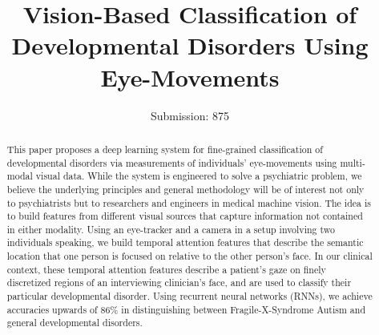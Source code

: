 \documentclass{llncs}
\begin{document}
  \title{Vision-Based Classification of Developmental Disorders Using Eye-Movements}
  \author{Submission: 875}
  \institute{}


  \maketitle

  \begin{abstract}
    This paper proposes a {\color{red} deep learning} system for fine-grained classification of developmental disorders via measurements of individuals' eye-movements using multi-modal visual data. While the system is engineered to solve a psychiatric problem, we believe the underlying principles and general methodology will be of interest not only to psychiatrists but to researchers and engineers in medical machine vision. The idea is to build features from different visual sources that capture information not contained in either modality. Using an eye-tracker and a camera in a setup involving two individuals speaking, we build temporal attention features that describe the semantic location that one person is focused on relative to the other person's face. In our clinical context, these temporal attention features describe a patient's gaze on finely discretized regions of an interviewing clinician's face, and are used to classify their particular developmental disorder. {\color{red} Using recurrent neural networks (RNNs), we achieve accuracies upwards of 86\% in distinguishing between Fragile-X-Syndrome Autism and general developmental disorders.}
  \end{abstract}

  \vspace{-2.5em}
\end{document}
